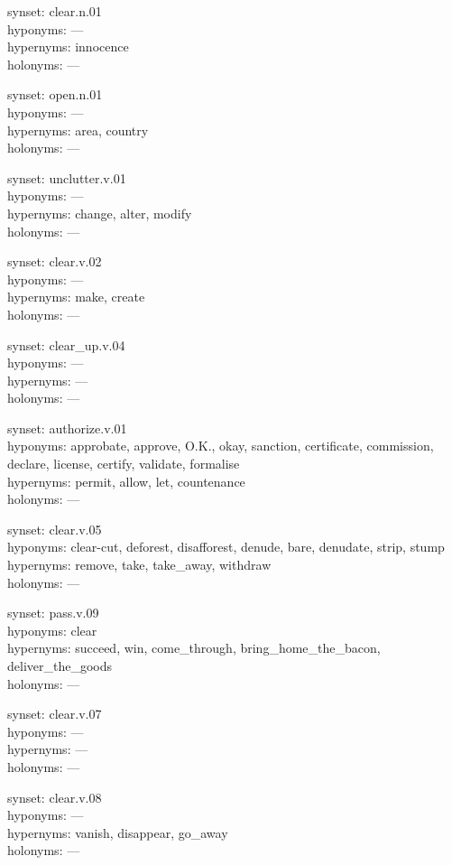 \begin{multicols}{2}
synset: clear.n.01\\
hyponyms: ---\\
hypernyms: innocence\\
holonyms: ---

synset: open.n.01\\
hyponyms: ---\\
hypernyms: area, country\\
holonyms: ---

synset: unclutter.v.01\\
hyponyms: ---\\
hypernyms: change, alter, modify\\
holonyms: ---

synset: clear.v.02\\
hyponyms: ---\\
hypernyms: make, create\\
holonyms: ---

synset: clear\_up.v.04\\
hyponyms: ---\\
hypernyms: ---\\
holonyms: ---

synset: authorize.v.01\\
hyponyms: approbate, approve, O.K., okay, sanction, certificate, commission, declare, license, certify, validate, formalise\\
hypernyms: permit, allow, let, countenance\\
holonyms: ---

synset: clear.v.05\\
hyponyms: clear-cut, deforest, disafforest, denude, bare, denudate, strip, stump\\
hypernyms: remove, take, take\_away, withdraw\\
holonyms: ---

synset: pass.v.09\\
hyponyms: clear\\
hypernyms: succeed, win, come\_through, bring\_home\_the\_bacon, deliver\_the\_goods\\
holonyms: ---

synset: clear.v.07\\
hyponyms: ---\\
hypernyms: ---\\
holonyms: ---

synset: clear.v.08\\
hyponyms: ---\\
hypernyms: vanish, disappear, go\_away\\
holonyms: ---


\end{multicols}
